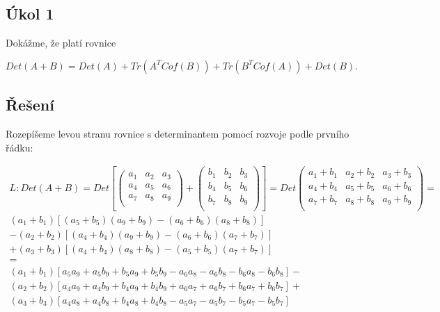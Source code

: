 \subsection{Úkol 1}

Dokážme, že platí rovnice 

$$
Det(A + B) = Det(A) + Tr(A^T Cof(B)) + Tr(B^T Cof(A)) + Det(B).
$$

\subsection{Řešení}

Rozepíšeme levou stranu rovnice s determinantem pomocí rozvoje podle prvního řádku:


\begin{gather*}
L: Det(A + B) =
Det\left[
    \begin{pmatrix}
        a_1 & a_2 & a_3 \\
        a_4 & a_5 & a_6 \\
        a_7 & a_8 & a_9 \\
    \end{pmatrix}
+
    \begin{pmatrix}
        b_1 & b_2 & b_3 \\
        b_4 & b_5 & b_6 \\
        b_7 & b_8 & b_9 \\
    \end{pmatrix}
\right]
=
Det
    \begin{pmatrix}
        a_1 + b_1 & a_2 + b_2 & a_3 + b_3 \\
        a_4 + b_4 & a_5 + b_5 & a_6 + b_6 \\
        a_7 + b_7 & a_8 + b_8 & a_9 + b_9 \\
    \end{pmatrix}
= \\
  (a_1 + b_1) \left[(a_5 + b_5) (a_9 + b_9) - (a_6 + b_6) (a_8 + b_8)\right] \\
- (a_2 + b_2) \left[(a_4 + b_4) (a_9 + b_9) - (a_6 + b_6) (a_7 + b_7)\right] \\
+ (a_3 + b_3) \left[(a_4 + b_4) (a_8 + b_8) - (a_5 + b_5) (a_7 + b_7)\right] \\
= \\
  (a_1 + b_1) \left[a_5 a_9 + a_5 b_9 + b_5 a_9 + b_5 b_9 - a_6 a_8 - a_6 b_8 - b_6 a_8 - b_6 b_8\right] - \\
(a_2 + b_2) \left[a_4 a_9 + a_4 b_9 + b_4 a_9 + b_4 b_9 + a_6 a_7 + a_6 b_7 + b_6 a_7 + b_6 b_7\right] + \\
(a_3 + b_3) \left[a_4 a_8 + a_4 b_8 + b_4 a_8 + b_4 b_8 - a_5 a_7 - a_5 b_7 - b_5 a_7 - b_5 b_7\right] \\
\end{gather*}

